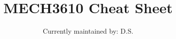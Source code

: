 \documentclass[10pt,twocolumn]{article}
\begin{document}
\title{\Huge \bf MECH3610 Cheat Sheet}
\author{\large Currently maintained by: D.S.}

\maketitle












\printbibliography
\end{document}
